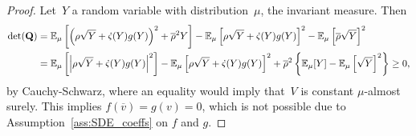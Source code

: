 \begin{proof}
Let~$Y$ a random variable with distribution~$\mu$, the invariant measure. Then 
\begin{align*}
\mathrm{det}(\boldsymbol{\mathrm{Q}}) &= \mathbb{E}_\mu\left[ \left( \rho\sqrt{Y} + \dot{\varsigma}(Y)g(Y)\right)^2 +\overline{\rho}^2 Y \right ]
- \mathbb{E}_\mu\left[ \rho\sqrt{Y} + \dot{\varsigma}(Y)g(Y) \right ]^2
- \mathbb{E}_\mu\left[ \overline{\rho} \sqrt{Y} \right ]^2 \\
&= \mathbb{E}_\mu\left[ \left| \rho\sqrt{Y} + \dot{\varsigma}(Y)g(Y)\right|^2 \right ] - \mathbb{E}_\mu\left[ \rho\sqrt{Y} + \dot{\varsigma}(Y)g(Y) \right ]^2 + \overline{\rho}^2
\left\{\mathbb{E}_\mu[Y]
- \mathbb{E}_\mu\left[\sqrt{Y}\right ]^2\right\}
\geq 0,
\end{align*}
by Cauchy-Schwarz, where an equality would imply that~$V$ is constant $\mu$-almost surely. 
This implies $f(\overline{v})=g(v)=0$, which is not possible due to Assumption~\ref{ass:SDE_coeffs} on $f$ and $g$. 
\end{proof}

